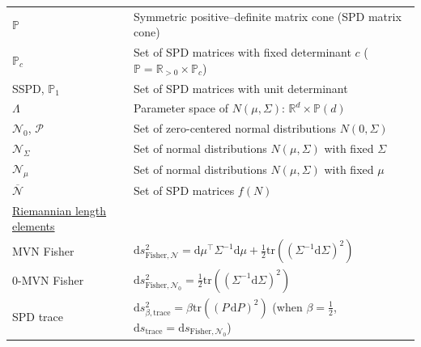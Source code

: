 \documentclass[entropy,article,accept,oneauthor,pdftex,entropy]{Definitions/mdpi}
\def\bbP{\mathbb{P}}
\def\dP{\mathrm{d}P}
\def\trace{\mathrm{trace}}
\def\barN{{\overline{\mathcal{N}}}}
\def\dP{\mathrm{d}P}
\def\bbR{\mathbb{R}}
\def\Fisher{\mathrm{Fisher}}
\def\tr{\mathrm{tr}}
\def\calN{\mathcal{N}}
\def\calP{\mathcal{P}}
\def\dSigma{\mathrm{d}\Sigma}
\def\dmu{\mathrm{d}\mu}
\def\ds{\mathrm{d}s}
\def\bbR{\mathbb{R}}
\begin{document}
{\begin{tabular}{@{}ll}
$\bbP$ & Symmetric positive–definite matrix cone (SPD matrix cone)\\
$\bbP_c$ & Set of SPD matrices with fixed determinant $c$ ($\bbP=\bbR_{>0}\times \bbP_c$)\\
SSPD, $\bbP_1$ & Set of SPD matrices with unit determinant\\
$\Lambda$ & Parameter space of $N(\mu,\Sigma)$: $\bbR^d\times\bbP(d)$\\
$\calN_0$, $\calP$ & Set of zero-centered normal distributions $N(0,\Sigma)$\\
$\calN_\Sigma$ & Set of normal distributions $N(\mu,\Sigma)$ with fixed $\Sigma$\\
$\calN_\mu$ & Set of normal distributions $N(\mu,\Sigma)$ with fixed $\mu$\\
$\barN$ & Set of SPD matrices $f(N)$\\
%
\underline{Riemannian length elements} & \\
MVN Fisher & $\ds_{\Fisher,\calN}^2=\dmu^\top \Sigma^{-1} \dmu + \frac{1}{2}\tr\left(\left(\Sigma^{-1}\dSigma\right)^2\right)$\\
$0$-MVN Fisher & $\ds_{\Fisher,\calN_0}^2=\frac{1}{2}\tr\left(\left(\Sigma^{-1}\dSigma\right)^2\right)$\\



SPD trace & $\ds_{\beta,\trace}^2=\beta \tr((P\,\dP)^2)$  (when $\beta=\frac{1}{2}$, $\ds_\trace=\ds_{\Fisher,\calN_0}$)\\

\end{tabular}

\noindent
\begin{tabular}{@{}p{4.1cm}l}


\end{tabular}}
\end{document}
